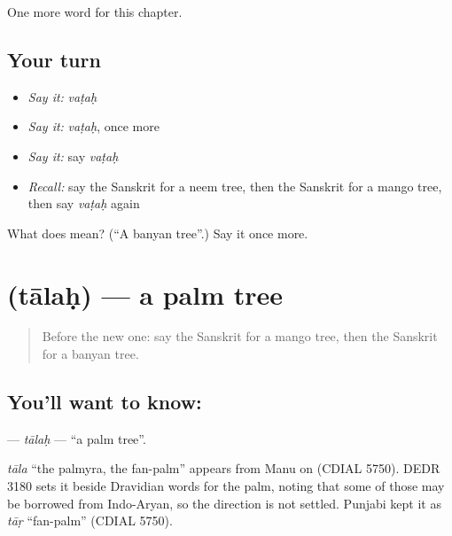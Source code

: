 \begin{grammarlens}[title={What you've built}]
One more word for this chapter.
\end{grammarlens}

\subsection*{Your turn}
\begin{itemize}
\raggedright
  \item \emph{Say it:} \emph{vaṭaḥ}
  \item \emph{Say it:} \emph{vaṭaḥ}, once more
  \item \emph{Say it:} say \emph{vaṭaḥ}
  \item \emph{Recall:} say the Sanskrit for a neem tree, then the Sanskrit for a mango tree, then say \emph{vaṭaḥ} again
\end{itemize}

\begin{tcolorbox}[breakable,colback=teal!4,colframe=teal!35!black,title={Before you move on}]
What does  mean? (\textquotedblleft{}A banyan tree\textquotedblright{}.) Say it once more.
\end{tcolorbox}
\section[\texorpdfstring{\sk{तालः} (tālaḥ)}{तालः (tālaḥ)}]{ (tālaḥ) — a palm tree}

\label{lesson:SA-C166-talah}



\begin{quote}
Before the new one: say the Sanskrit for a mango tree, then the Sanskrit for a banyan tree.
\end{quote}

\subsection*{You'll want to know: }
\textbf{} — \emph{tālaḥ} — \textquotedblleft{}a palm tree\textquotedblright{}.

\begin{cousinweb}
\emph{tāla} \textquotedblleft{}the palmyra, the fan-palm\textquotedblright{} appears from Manu on (CDIAL 5750). DEDR 3180 sets it beside Dravidian words for the palm, noting that some of those may be borrowed from Indo-Aryan, so the direction is not settled. Punjabi kept it as \emph{tāṛ} \textquotedblleft{}fan-palm\textquotedblright{} (CDIAL 5750).
\end{cousinweb}

